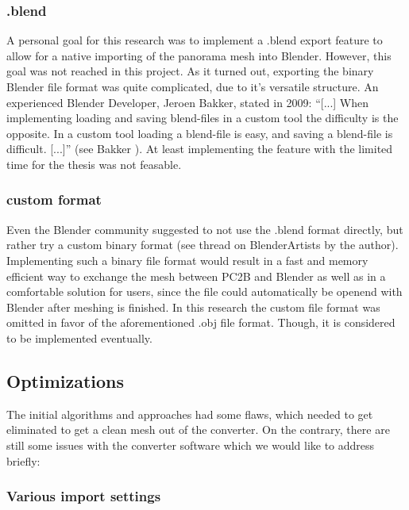 \subsubsection{.blend}

A personal goal for this research was to implement a .blend export feature to allow for a native importing of the panorama mesh into Blender. However, this goal was not reached in this project. As it turned out, exporting the binary Blender file format was quite complicated, due to it's versatile structure. An experienced Blender Developer, Jeroen Bakker, stated in 2009: “[...] When implementing loading and saving blend-files in a custom tool the difficulty is the opposite. In a custom tool loading a blend-file is easy, and saving a blend-file is difficult. [...]” (see Bakker \parencite{webMysteryOfTheBlend}). At least implementing the feature with the limited time for the thesis was not feasable.

\subsubsection{custom format}

Even the Blender community suggested to not use the .blend format directly, but rather try a custom binary format (see thread on BlenderArtists \parencite{webBlenderArtistsBlendExport} by the author). Implementing such a binary file format would result in a fast and memory efficient way to exchange the mesh between PC2B and Blender as well as in a comfortable solution for users, since the file could automatically be openend with Blender after meshing is finished. In this research the custom file format was omitted in favor of the aforementioned .obj file format. Though, it is considered to be implemented eventually.

\subsection{Optimizations}

The initial algorithms and approaches had some flaws, which needed to get eliminated to get a clean mesh out of the converter. On the contrary, there are still some issues with the converter software which we would like to address briefly:

\subsubsection{Various import settings}

